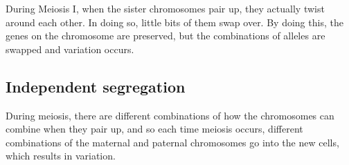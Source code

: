 \documentclass{article}
\begin{document}
During Meiosis I, when the sister chromosomes pair up, they actually twist
around each other. In doing so, little bits of them swap over. By doing this,
the genes on the chromosome are preserved, but the combinations of alleles are
swapped and variation occurs.

\subsection*{Independent segregation}

During meiosis, there are different combinations of how the chromosomes can
combine when they pair up, and so each time meiosis occurs, different
combinations of the maternal and paternal chromosomes go into the new cells,
which results in variation.
\end{document}

